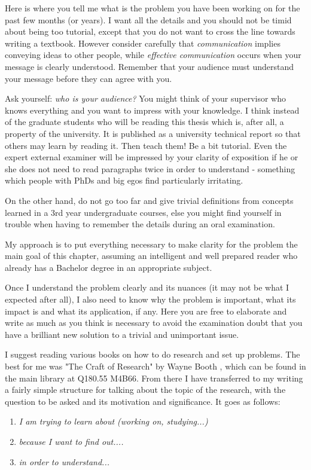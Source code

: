 \label{chapter:problem}

\newlength{\savedunitlength}
\setlength{\unitlength}{2em}

Here is where you tell me what is the problem you have been working on for the past few months (or years). I want all the details and you should not be timid about being too tutorial, except that you do not want to cross the line towards writing a textbook. However consider carefully that \textit{communication} implies conveying ideas to other people, while \textit{effective communication} occurs when your message is clearly understood. Remember that your audience must understand your message before they can agree with you.

Ask yourself:
\textit{who is your audience?} You might think of your supervisor who knows everything and you want to impress with your knowledge. I think instead of the graduate students who will be reading this thesis which is, after all, a property of the university. It is published as a university technical report so that others may learn by reading it. Then teach them! Be a bit tutorial. Even the expert external examiner will be impressed by your clarity of exposition if he or she does not need to read paragraphs twice in order to understand - something which people with PhDs and big egos find particularly irritating.

On the other hand, do not go too far and give trivial definitions from concepts learned in a 3rd year undergraduate courses, else you might find yourself in trouble when having to remember the details during an oral examination.

My approach is to put everything necessary to make clarity for
the problem the main goal of this chapter, assuming an intelligent and well prepared reader who already has a Bachelor degree in an appropriate subject.

Once I understand the problem clearly and its nuances (it may not be what I expected after all), I also need to know why the problem is important, what its impact is and what its application, if any. Here you are free to elaborate and write as much as you think is necessary to avoid the examination doubt that you have a brilliant new solution to a trivial and unimportant issue.

I suggest reading various books on how to do research and set up problems. The best for me was "The Craft of Research" by Wayne Booth \cite{booth1}, which can be found in the main library at Q180.55 M4B66. From there I have transferred to my writing a fairly simple structure for talking about the topic of the research, with the question to be asked and its motivation and significance. It goes as follows:
\begin{enumerate}
\item {\textit{I am trying to learn about (working on, studying...)}}
\item {\textit{because I want to find out....}}
\item {\textit{in order to understand...}}
\end{enumerate}

